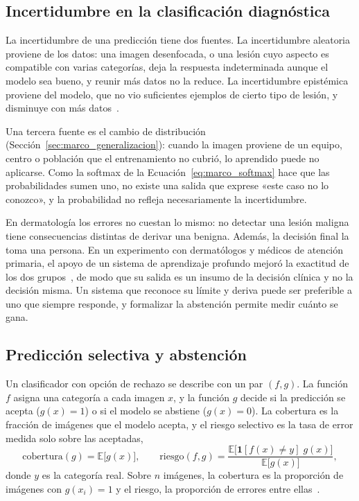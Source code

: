 \subsection{Incertidumbre en la clasificación diagnóstica}
\label{sec:marco_incert_fuentes}

La incertidumbre de una predicción tiene dos fuentes. La incertidumbre aleatoria proviene de los datos: una
imagen desenfocada, o una lesión cuyo aspecto es compatible con varias categorías, deja la respuesta
indeterminada aunque el modelo sea bueno, y reunir más datos no la reduce. La incertidumbre epistémica
proviene del modelo, que no vio suficientes ejemplos de cierto tipo de lesión, y disminuye con más
datos~\cite{kendall2017uncertainties}.

Una tercera fuente es el cambio de distribución (Sección~\ref{sec:marco_generalizacion}): cuando la imagen
proviene de un equipo, centro o población que el entrenamiento no cubrió, lo aprendido puede no aplicarse.
Como la softmax de la Ecuación~\ref{eq:marco_softmax} hace que las probabilidades sumen uno, no existe una
salida que exprese «este caso no lo conozco», y la probabilidad no refleja necesariamente la incertidumbre.

En dermatología los errores no cuestan lo mismo: no detectar una lesión maligna tiene consecuencias
distintas de derivar una benigna. Además, la decisión final la toma una persona. En un experimento con
dermatólogos y médicos de atención primaria, el apoyo de un sistema de aprendizaje profundo mejoró la
exactitud de los dos grupos~\cite{groh2024learningaided}, de modo que su salida es un insumo de la decisión
clínica y no la decisión misma. Un sistema que reconoce su límite y deriva puede ser preferible a uno que
siempre responde, y formalizar la abstención permite medir cuánto se gana.

\subsection{Predicción selectiva y abstención}
\label{sec:marco_pred_selectiva}

Un clasificador con opción de rechazo se describe con un par $(f, g)$. La función $f$ asigna una categoría a
cada imagen $x$, y la función $g$ decide si la predicción se acepta ($g(x) = 1$) o si el modelo se abstiene
($g(x) = 0$). La cobertura es la fracción de imágenes que el modelo acepta, y el riesgo selectivo es la tasa
de error medida solo sobre las aceptadas,
\begin{equation}
    \mathrm{cobertura}(g) = \mathbb{E}\bigl[g(x)\bigr], \qquad
    \mathrm{riesgo}(f, g) = \frac{\mathbb{E}\bigl[\mathbf{1}[f(x) \neq y]\; g(x)\bigr]}{\mathbb{E}\bigl[g(x)\bigr]},
    \label{eq:marco_riesgo_selectivo}
\end{equation}
donde $y$ es la categoría real. Sobre $n$ imágenes, la cobertura es la proporción de imágenes con
$g(x_i) = 1$ y el riesgo, la proporción de errores entre ellas~\cite{elyaniv2010foundations,geifman2017selective}.

